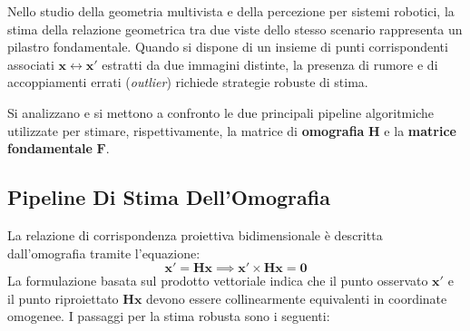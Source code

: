﻿\documentclass[11pt, a4paper]{article}
\begin{document}
Nello studio della geometria multivista e della percezione per sistemi robotici, la stima della relazione geometrica tra due viste dello stesso scenario rappresenta un pilastro fondamentale. Quando si dispone di un insieme di punti corrispondenti associati $\bm{x} \leftrightarrow \bm{x}'$ estratti da due immagini distinte, la presenza di rumore e di accoppiamenti errati (\emph{outlier}) richiede strategie robuste di stima.

Si analizzano e si mettono a confronto le due principali pipeline algoritmiche utilizzate per stimare, rispettivamente, la matrice di \textbf{omografia} $\bm{H}$ e la \textbf{matrice fondamentale} $\bm{F}$.


\subsection{Pipeline Di Stima Dell'Omografia}

La relazione di corrispondenza proiettiva bidimensionale è descritta dall'omografia tramite l'equazione:
\[ \bm{x}' = \bm{H}\bm{x} \implies \bm{x}' \times \bm{H}\bm{x} = \bm{0} \]
La formulazione basata sul prodotto vettoriale indica che il punto osservato $\bm{x}'$ e il punto riproiettato $\bm{H}\bm{x}$ devono essere collinearmente equivalenti in coordinate omogenee. I passaggi per la stima robusta sono i seguenti:
\end{document}
